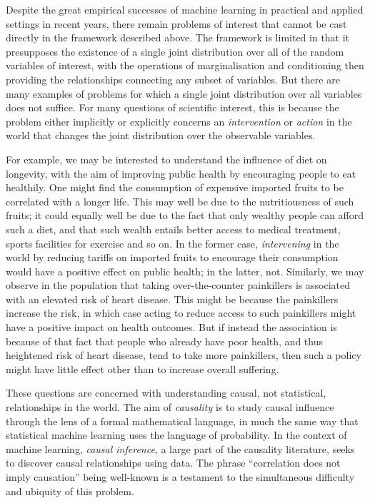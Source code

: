 Despite the great empirical successes of machine learning in practical and applied settings in recent years, there remain problems of interest that cannot be cast directly in the framework described above. 
The framework is limited in that it presupposes the existence of a single joint distribution over all of the random variables of interest, with the operations of marginalisation and conditioning then providing the relationships connecting any subset of variables.
But there are many examples of problems for which a single joint distribution over all variables does not suffice. 
For many questions of scientific interest, this is because the problem either implicitly or explicitly concerns an \emph{intervention} or \emph{action} in the world that changes the joint distribution over the observable variables.

For example, we may be interested to understand the influence of diet on longevity, with the aim of improving public health by encouraging people to eat healthily. 
One might find the consumption of expensive imported fruits to be correlated with a longer life. This may well be due to the nutritiousness of such fruits; it could equally well be due to the fact that only wealthy people can afford such a diet, and that such wealth entails better access to medical treatment, sports facilities for exercise and so on. In the former case, \emph{intervening} in the world by reducing tariffs on imported fruits to encourage their consumption would have a positive effect on public health; in the latter, not.
Similarly, we may observe in the population that taking over-the-counter painkillers is associated with an elevated risk of heart disease. This might be because the painkillers increase the risk, in which case acting to reduce access to such painkillers might have a positive impact on health outcomes. But if instead the association is because of that fact that people who already have poor health, and thus heightened risk of heart disease, tend to take more painkillers, then such a policy might have little effect other than to increase overall suffering.

These questions are concerned with understanding causal, not statistical, relationships in the world. 
The aim of \emph{causality} is to study causal influence through the lens of a formal mathematical language, in much the same way that statistical machine learning uses the language of probability. 
In the context of machine learning, \emph{causal inference}, a large part of the causality literature, seeks to discover causal relationships using data.
The phrase ``correlation does not imply causation'' being well-known is a testament to the simultaneous difficulty and ubiquity of this problem.

